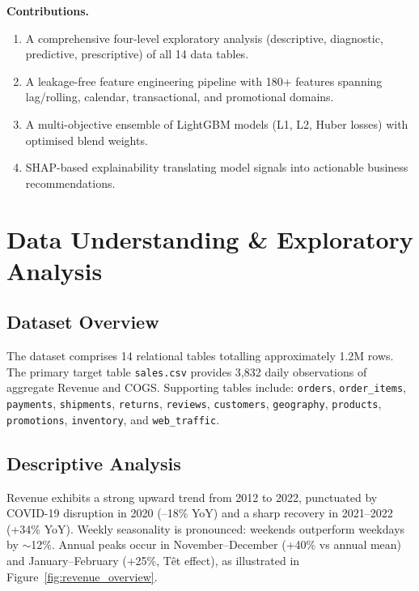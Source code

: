 \documentclass[10pt,a4paper]{article}
\begin{document}
\textbf{Contributions.}
\begin{enumerate}[leftmargin=1.5em,itemsep=2pt]
  \item A comprehensive four-level exploratory analysis (descriptive,
        diagnostic, predictive, prescriptive) of all 14 data tables.
  \item A leakage-free feature engineering pipeline with 180+ features
        spanning lag/rolling, calendar, transactional, and promotional domains.
  \item A multi-objective ensemble of LightGBM models (L1, L2, Huber losses)
        with optimised blend weights.
  \item SHAP-based explainability translating model signals into actionable
        business recommendations.
\end{enumerate}

\section{Data Understanding \& Exploratory Analysis}
\label{sec:eda}

\subsection{Dataset Overview}

The dataset comprises 14 relational tables totalling approximately 1.2M rows.
The primary target table \texttt{sales.csv} provides 3,832 daily observations
of aggregate Revenue and COGS.
Supporting tables include: \texttt{orders}, \texttt{order\_items},
\texttt{payments}, \texttt{shipments}, \texttt{returns}, \texttt{reviews},
\texttt{customers}, \texttt{geography}, \texttt{products},
\texttt{promotions}, \texttt{inventory}, and \texttt{web\_traffic}.

\subsection{Descriptive Analysis}

Revenue exhibits a strong upward trend from 2012 to 2022, punctuated by
COVID-19 disruption in 2020 (--18\% YoY) and a sharp recovery in 2021--2022
(+34\% YoY).
Weekly seasonality is pronounced: weekends outperform weekdays by $\sim$12\%.
Annual peaks occur in November--December (+40\% vs annual mean) and
January--February (+25\%, T\^{e}t effect), as illustrated in
Figure~\ref{fig:revenue_overview}.
\end{document}

